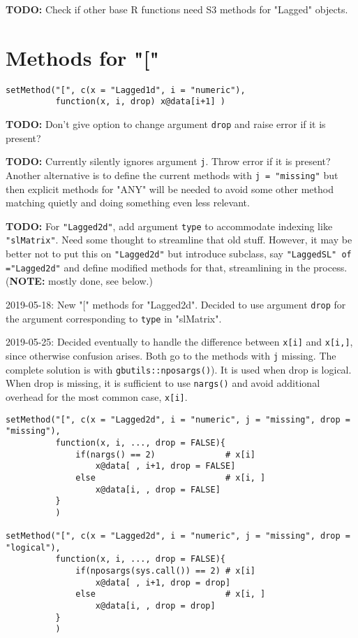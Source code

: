 \documentclass[11pt,a4paper]{article}
\begin{document}
\textbf{TODO:} Check if other base R functions need S3 methods for "Lagged" objects.




\section{Methods for "["}
\label{sec:orgfad224c}

\begin{verbatim}
setMethod("[", c(x = "Lagged1d", i = "numeric"),
          function(x, i, drop) x@data[i+1] )
\end{verbatim}


\textbf{TODO:} Don't give option to change argument \texttt{drop} and raise error if it is present?

\textbf{TODO:} Currently silently ignores argument \texttt{j}. Throw error if it is present?
    Another alternative is to define the current methods with \texttt{j = "missing"} but then
    explicit methods for "ANY" will be needed to avoid some other method matching quietly and
    doing something even less relevant.

\textbf{TODO:} For \texttt{"Lagged2d"}, add argument \texttt{type} to accommodate indexing like \texttt{"slMatrix"}.
    Need some thought to streamline that old stuff. However, it may be better not to put this on
    \texttt{"Lagged2d"} but introduce subclass, say \texttt{"LaggedSL" of ="Lagged2d"} and define modified
    methods for that, streamlining in the process.
    (\textbf{NOTE:} mostly done, see below.)   

2019-05-18: New "[" methods for "Lagged2d". Decided to use argument \texttt{drop} for the argument
corresponding to \texttt{type} in "slMatrix". 

2019-05-25: Decided eventually to handle the difference between \texttt{x[i]} and \texttt{x[i,]}, since
otherwise confusion arises.  Both go to the methods with \texttt{j} missing. The complete solution
is with \texttt{gbutils::nposargs()}). It is used when drop is logical. When drop is missing, it is
sufficient to use \texttt{nargs()} and avoid additional overhead for the most common case, \texttt{x[i]}.
\begin{verbatim}
setMethod("[", c(x = "Lagged2d", i = "numeric", j = "missing", drop = "missing"),
          function(x, i, ..., drop = FALSE){
              if(nargs() == 2)              # x[i]
                  x@data[ , i+1, drop = FALSE] 
              else                          # x[i, ]
                  x@data[i, , drop = FALSE] 
          }
          )

setMethod("[", c(x = "Lagged2d", i = "numeric", j = "missing", drop = "logical"),
          function(x, i, ..., drop = FALSE){
              if(nposargs(sys.call()) == 2) # x[i]
                  x@data[ , i+1, drop = drop]
              else                          # x[i, ]
                  x@data[i, , drop = drop]
          } 
          )
\end{verbatim}
\end{document}
